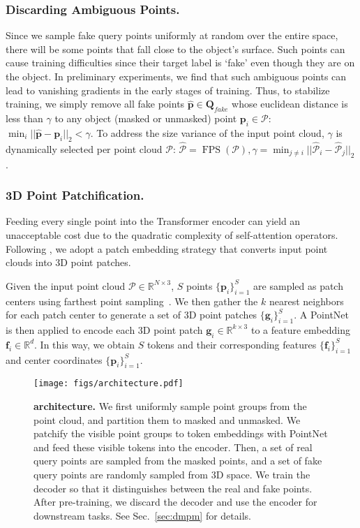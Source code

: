 \documentclass[runningheads]{llncs}
\begin{document}
\subsubsection{Discarding Ambiguous Points.}
\label{AmbiguousPts}
Since we sample fake query points uniformly at random over the entire space, there will be some points that fall close to the object's surface. Such points can cause training difficulties since their target label is `fake' even though they are on the object.  In preliminary experiments, we find that such ambiguous points can lead to vanishing gradients in the early stages of training.  Thus, to stabilize training, we simply remove all fake points $\mathbf{\hat{p}} \in \mathbf{Q}_{fake}$ whose euclidean distance is less than $\gamma$ to any object (masked or unmasked) point $\mathbf{p}_i \in \mathcal{P}$: $\min_i ||\mathbf{\hat{p}} - \mathbf{p}_i||_2 < \gamma$.
To address the size variance of the input point cloud, $\gamma$ is dynamically selected per point cloud $\mathcal{P}$: $\hat{\mathcal{P}} = \operatorname{FPS}(\mathcal{P}), \gamma = \min_{j \neq i} ||\hat{\mathcal{P}}_i - \hat{\mathcal{P}}_j||_2$.

\vspace{-10pt}
\subsubsection{3D Point Patchification.}
\label{Point Patchify}
Feeding every single point into the Transformer encoder can yield an unacceptable cost due to the quadratic complexity of self-attention operators.  Following \cite{yu2021point,dosovitskiy2020vit}, we adopt a patch embedding strategy that converts input point clouds into 3D point patches.

Given the input point cloud $\mathcal{P} \in \mathbb{R}^{N \times 3}$, $S$ points $\{\mathbf{p}_i\}_{i=1}^S$ are sampled as patch centers using farthest point sampling~\cite{qi2017pointnetplusplus}.  We then gather the $k$ nearest neighbors for each patch center to generate a set of 3D point patches $\{\mathbf{g}_i\}_{i=1}^{S}$.  A PointNet~\cite{qi2017pointnet} is then applied to encode each 3D point patch $\mathbf{g}_i \in \mathbb{R}^{k \times 3}$ to a feature embedding $\mathbf{f}_i \in \mathbb{R}^d$.  In this way, we obtain $S$ tokens and their corresponding features $\{\mathbf{f}_i\}_{i=1}^S$ and center coordinates $\{\mathbf{p}_i\}_{i=1}^S$.

\begin{figure}[t]
    \centering
    \texttt{[image: figs/architecture.pdf]}
    \caption{\textbf{\methodname{} architecture.} We first uniformly sample point groups from the point cloud, and partition them to masked and unmasked.  We patchify the visible point groups to token embeddings with PointNet and feed these visible tokens into the encoder.  Then, a set of real query points are sampled from the masked points, and a set of fake query points are randomly sampled from 3D space.  We train the decoder so that it distinguishes between the real and fake points. After pre-training, we discard the decoder and use the encoder for downstream tasks. See Sec.~\ref{sec:dmpm} for details.}
    \label{fig:architecture}
\end{figure}
\end{document}
